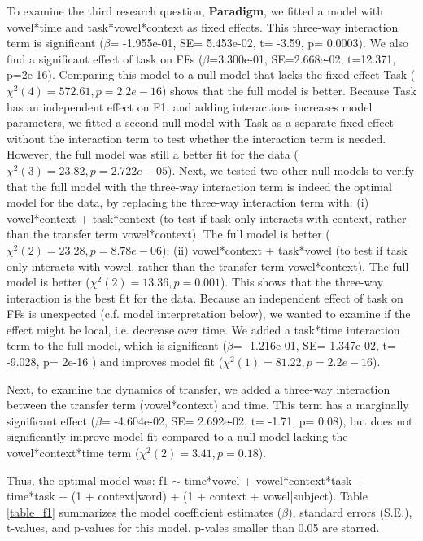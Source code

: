 To examine the third research question, \textbf{Paradigm}, we fitted a model with vowel*time and task*vowel*context as fixed effects. This three-way interaction term is significant ($\beta$= -1.955e-01, SE=  5.453e-02, t= -3.59, p= 0.0003). We also find a significant effect of task on FFs ($\beta$=3.300e-01, SE=2.668e-02, t=12.371, p=2e-16). Comparing this model to a null model that lacks the fixed effect Task ($\chi^2(4) = 572.61, p=  2.2e-16$) shows that the full model is better. Because Task has an independent effect on F1, and adding interactions increases model parameters, we fitted a second null model with Task as a separate fixed effect without the interaction term to test whether the interaction term is needed. However, the full model was still a better fit for the data ($\chi^2(3) = 23.82, p=  2.722e-05$). Next, we tested two other null models to verify that the full model with the three-way interaction term is indeed the optimal model for the data, by replacing the three-way interaction term with: (i) vowel*context + task*context (to test if task only interacts with context, rather than the transfer term vowel*context). The full model is better ($\chi^2(2) = 23.28, p= 8.78e-06$); (ii) vowel*context + task*vowel (to test if task only interacts with vowel, rather than the transfer term vowel*context). The full model is better ($\chi^2(2) = 13.36, p= 0.001$). This shows that the three-way interaction is the best fit for the data. Because an independent effect of task on FFs is unexpected (c.f. model interpretation below), we wanted to examine if the effect might be local, i.e. decrease over time. We added a task*time interaction term to the full model, which is significant ($\beta$= -1.216e-01, SE=  1.347e-02, t= -9.028, p= 2e-16 ) and improves model fit ($\chi^2(1) = 81.22, p= 2.2e-16$).

Next, to examine the dynamics of transfer, we added a three-way interaction between the transfer term (vowel*context) and time. This term has a marginally significant effect ($\beta$= -4.604e-02, SE=  2.692e-02, t= -1.71, p= 0.08), but does not significantly improve model fit compared to a null model lacking the vowel*context*time term ($\chi^2(2) = 3.41, p= 0.18$).

Thus, the optimal model was: f1 $\sim$ time*vowel + vowel*context*task + time*task + (1 + context|word) + (1 + context + vowel|subject). Table \ref{table_f1} summarizes the model coefficient estimates ($\beta$), standard errors (S.E.), t-values, and p-values for this model. p-vales smaller than 0.05 are starred. 



